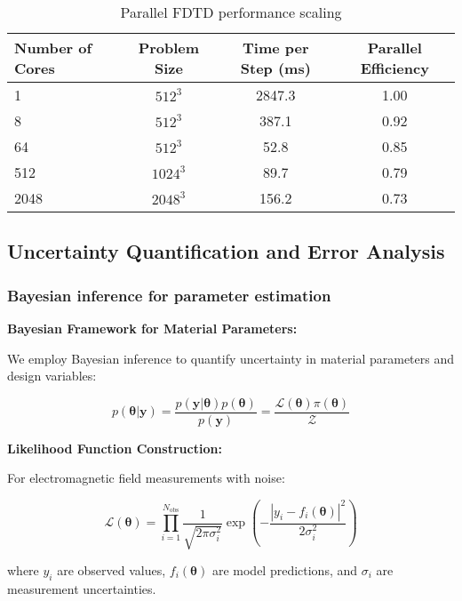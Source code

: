 \documentclass[11pt]{article}
\begin{document}
\begin{table}[h]
\centering
\caption{Parallel FDTD performance scaling}
\begin{tabular}{lccc}
\toprule
Number of Cores & Problem Size & Time per Step (ms) & Parallel Efficiency \\
\midrule
1 & $512^3$ & 2847.3 & 1.00 \\
8 & $512^3$ & 387.1 & 0.92 \\
64 & $512^3$ & 52.8 & 0.85 \\
512 & $1024^3$ & 89.7 & 0.79 \\
2048 & $2048^3$ & 156.2 & 0.73 \\
\bottomrule
\end{tabular}
\end{table}



\subsection{Uncertainty Quantification and Error Analysis}

\subsubsection{Bayesian inference for parameter estimation}

\textbf{Bayesian Framework for Material Parameters:}

We employ Bayesian inference to quantify uncertainty in material parameters and design variables:

\begin{equation}
p(\boldsymbol{\theta}|\mathbf{y}) = \frac{p(\mathbf{y}|\boldsymbol{\theta}) p(\boldsymbol{\theta})}{p(\mathbf{y})} = \frac{\mathcal{L}(\boldsymbol{\theta}) \pi(\boldsymbol{\theta})}{\mathcal{Z}}
\end{equation}

\textbf{Likelihood Function Construction:}

For electromagnetic field measurements with noise:

\begin{equation}
\mathcal{L}(\boldsymbol{\theta}) = \prod_{i=1}^{N_{\text{obs}}} \frac{1}{\sqrt{2\pi\sigma_i^2}} \exp\left(-\frac{|y_i - f_i(\boldsymbol{\theta})|^2}{2\sigma_i^2}\right)
\end{equation}

where $y_i$ are observed values, $f_i(\boldsymbol{\theta})$ are model predictions, and $\sigma_i$ are measurement uncertainties.
\end{document}
